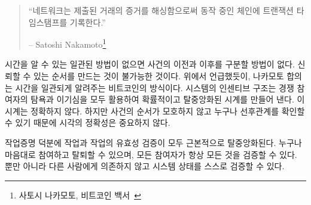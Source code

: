 \begin{quotation}\begin{samepage}
		\enquote{네트워크는 제출된 거래의 증거를 해싱함으로써 동작 중인 체인에 트랜잭션 타임스탬프를 기록한다.}
		\begin{flushright} -- Satoshi Nakamoto\footnote{사토시 나카모토, 비트코인 백서~\cite{whitepaper}}
\end{flushright}\end{samepage}\end{quotation}

\begin{comment}
	Without a consistent way to tell the time, there is no consistent way to
	tell before from after. Reliable ordering is impossible. As mentioned
	above, Nakamoto consensus is Bitcoin's way to consistently tell the
	time. The system's incentive structure produces a probabilistic,
	decentralized clock, by utilizing both greed and self-interest of
	competing participants. The fact that this clock is imprecise is
	irrelevant because the order of events is eventually unambiguous and can
	be verified by anyone.
\end{comment}
시간을 알 수 있는 일관된 방법이 없으면 사건의 이전과 이후를 구분할 방법이 없다.
신뢰할 수 있는 순서를 만드는 것이 불가능한 것이다.
위에서 언급했듯이, 나카모토 합의는 시간을 일관되게 알려주는 비트코인의 방식이다.
시스템의 인센티브 구조는 경쟁 참여자의 탐욕과 이기심을 모두 활용하여 확률적이고 탈중앙화된 시계를 만들어 낸다.
이 시계는 정확하지 않다. 하지만 사건의 순서가 모호하지 않고 누구나 선후관계를 확인할 수 있기 때문에 시각의 정확성은 중요하지 않다.

\begin{comment}
	Thanks to proof-of-work, both the work \textit{and} the validation of the work
	are radically decentralized. Everyone can join and leave at will, and
	everyone can validate everything at all times. Not only that, but
	everyone can validate the state of the system \textit{individually}, without
	having to rely on anyone else for validation.
\end{comment}
작업증명 덕분에 작업과 작업의 유효성 검증이 모두 근본적으로 탈중앙화된다.
누구나 마음대로 참여하고 탈퇴할 수 있으며, 모든 참여자가 항상 모든 것을 검증할 수 있다.
뿐만 아니라 다른 사람에게 의존하지 않고 시스템 상태를 스스로 검증할 수 있다.


